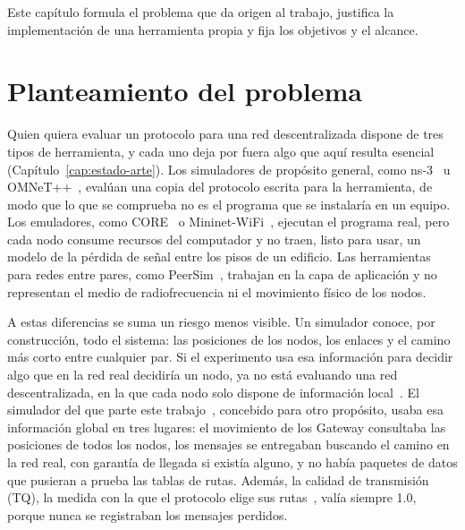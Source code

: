 
Este capítulo formula el problema que da origen al trabajo, justifica la
implementación de una herramienta propia y fija los objetivos y el alcance.

\section{Planteamiento del problema}
\label{sec:problema}

Quien quiera evaluar un protocolo para una red descentralizada dispone de tres
tipos de herramienta, y cada uno deja por fuera algo que aquí resulta esencial
(Capítulo~\ref{cap:estado-arte}). Los simuladores de propósito general, como
ns-3~\cite{Riley2010ns3} u OMNeT++~\cite{Varga2008Omnetpp}, evalúan una copia del
protocolo escrita para la herramienta, de modo que lo que se comprueba no es el
programa que se instalaría en un equipo. Los emuladores, como
CORE~\cite{Ahrenholz2008Core} o Mininet-WiFi~\cite{Fontes2015MininetWifi},
ejecutan el programa real, pero cada nodo consume recursos del computador y no
traen, listo para usar, un modelo de la pérdida de señal entre los pisos de un
edificio. Las
herramientas para redes entre pares, como PeerSim~\cite{Montresor2009Peersim},
trabajan en la capa de aplicación y no representan el medio de radiofrecuencia
ni el movimiento físico de los nodos.

A estas diferencias se suma un riesgo menos visible. Un simulador conoce, por
construcción, todo el sistema: las posiciones de los nodos, los enlaces y el
camino más corto entre cualquier par. Si el experimento usa esa información para
decidir algo que en la red real decidiría un nodo, ya no está evaluando una red
descentralizada, en la que cada nodo solo dispone de información
local~\cite{Corson1999RFC2501}. El simulador del que parte este
trabajo~\cite{JofsanchezciSimulador}, concebido para otro propósito, usaba esa
información global en tres lugares: el movimiento de los Gateway consultaba las
posiciones de todos los nodos, los mensajes se entregaban buscando el camino en
la red real, con garantía de llegada si existía alguno, y no había paquetes de
datos que pusieran a prueba las tablas de rutas. Además, la calidad de
transmisión (TQ), la medida con la que el protocolo elige sus
rutas~\cite{Seither2011BatmanAdv}, valía siempre 1.0, porque nunca se
registraban los mensajes perdidos.

